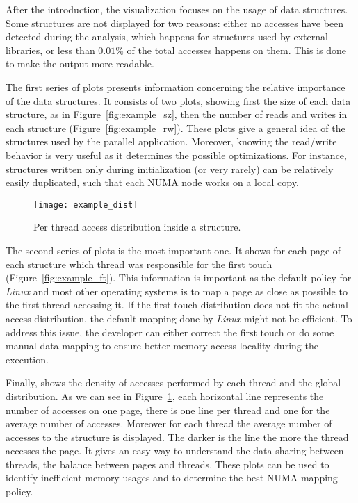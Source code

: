 After the introduction, the visualization focuses on the usage of data structures. Some
structures are not displayed for two reasons: either no accesses have been
detected during the analysis, which happens for structures used by external
libraries, or less than $0.01\%$ of the total accesses happens on them. This is
done to make the output more readable.

The first series of plots presents information concerning the relative
importance of the data structures. It consists of two plots, showing first the
size of each data structure, as in Figure~\ref{fig:example_sz}, then the
number of reads and writes  in each structure (Figure~\ref{fig:example_rw}). These plots give a
general idea of the structures used by the parallel application.
Moreover, knowing the read/write behavior is very
useful as it determines the possible optimizations. For instance, structures
written only during initialization (or very rarely) can be relatively easily
duplicated, such that each NUMA node works on a local copy.

\begin{figure}[!htb]
    \centering
    \texttt{[image: example\_dist]}
    \caption{Per thread access distribution inside a structure.}
    \label{fig:example_dist}
\end{figure}

The second series of plots is the most important one. It
shows for each page of each structure
which thread was responsible for the first touch
(Figure~\ref{fig:example_ft}). This information is important as the
default policy for \emph{Linux} and most other operating systems is to map a page as close as possible to the first
thread accessing it. If the first touch distribution does not fit the actual
access distribution, the default mapping done by \emph{Linux} might not be
efficient. To address this issue, the developer can either correct the first
touch or do some manual data mapping to ensure better memory access locality
during the execution.

Finally, \TABARNAC shows the density of accesses performed by each thread and
the global distribution. As we can see in Figure~\ref{fig:example_dist}, each
horizontal line represents the number of accesses on one page, there is one
line per thread and one for the average number of accesses. Moreover for each
thread the average number of accesses to the structure is displayed. The
darker is the line the more the thread accesses the page. It gives an easy way
to understand the data sharing between threads, the balance between pages and
threads. These plots can be used to identify inefficient memory usages and to
determine the best NUMA mapping policy.

